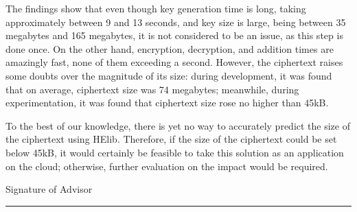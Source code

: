 The findings show that even though key generation time is long, taking approximately between 9 and 13 seconds, and key size is large, being between 35 megabytes and 165 megabytes, it is not considered to be an issue, as this step is done once. On the other hand, encryption, decryption, and addition times are amazingly fast, none of them exceeding a second. However, the ciphertext raises some doubts over the magnitude of its size: during development, it was found that on average, ciphertext size was 74 megabytes; meanwhile, during experimentation, it was found that ciphertext size rose no higher than 45kB.

\pagebreak[4]

To the best of our knowledge, there is yet no way to accurately predict the size of the ciphertext using HElib. Therefore, if the size of the ciphertext could be set below 45kB, it would certainly be feasible to take this solution as an application on the cloud; otherwise, further evaluation on the impact would be required.

\noindent Signature of Advisor \rule{72mm}{0.3pt}

\vspace*{-4mm}
\noindent \phantom{Advisor signature: m} \asesor
